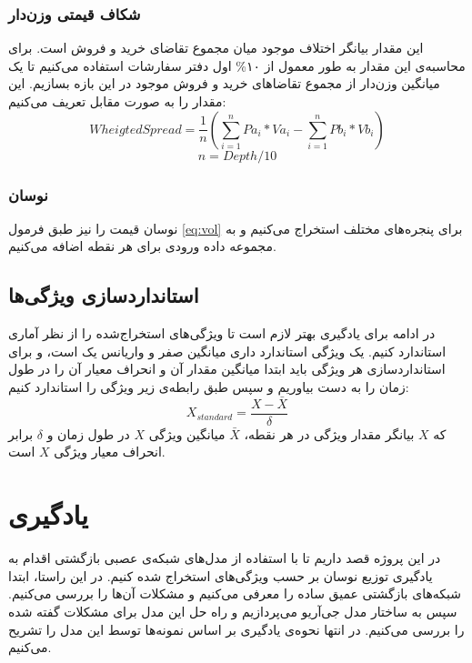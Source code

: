 \subsubsection{شکاف قیمتی وزن‌دار}
این مقدار بیانگر اختلاف موجود میان مجموع تقاضای خرید و فروش است. برای محاسبه‌ی این مقدار به طور معمول از ۱۰\% اول دفتر سفارشات استفاده می‌کنیم تا یک میانگین وزن‌دار از مجموع تقاضاهای خرید و فروش موجود در این بازه بسازیم. این مقدار را به صورت مقابل تعریف می‌کنیم:
\begin{equation}
	WheigtedSpread = \dfrac{1}{n}(\sum_{i=1}^{n}Pa_i * Va_i - \sum_{i=1}^{n}Pb_i * Vb_i)
\end{equation}
\vspace{-2em}
$$
	n = Depth / 10
$$
\newpage
\subsubsection{نوسان}
نوسان قیمت را نیز طبق فرمول \ref{eq:vol} برای پنجره‌های مختلف استخراج می‌کنیم و به مجموعه‌ داده ورودی برای هر نقطه اضافه می‌کنیم.
\subsection{استانداردسازی ویژگی‌ها}
در ادامه برای یادگیری بهتر لازم است تا ویژگی‌های استخراج‌شده را از نظر آماری استاندارد کنیم. یک ویژگی استاندارد داری میانگین صفر و واریانس یک است،‌ و برای استانداردسازی هر ویژگی باید ابتدا میانگین مقدار آن و انحراف معیار آن را در طول زمان را به دست بیاوریم و سپس طبق رابطه‌ی زیر ویژگی را استاندارد کنیم:
\begin{equation}
	X_{standard} = \dfrac{X - \bar{X}}{\delta}
\end{equation}
که $X$ بیانگر مقدار ویژگی در هر نقطه، $\bar{X}$ میانگین ویژگی $X$ در طول زمان و $\delta$ برابر انحراف معیار ویژگی $X$ است.
\section{یادگیری}
در این پروژه قصد داریم تا با استفاده از مدل‌های شبکه‌ی عصبی بازگشتی اقدام به یادگیری توزیع نوسان بر حسب ویژگی‌های استخراج شده کنیم. در این راستا، ابتدا شبکه‌های بازگشتی عمیق ساده را معرفی می‌کنیم و مشکلات آن‌ها را بررسی می‌کنیم. سپس به ساختار مدل جی‌آریو می‌پردازیم و راه حل این مدل برای مشکلات گفته شده را بررسی می‌کنیم. در انتها نحوه‌ی یادگیری بر اساس نمونه‌ها توسط این مدل را تشریح می‌کنیم.
